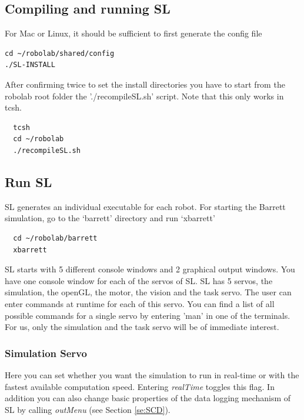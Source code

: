 \documentclass[11pt, article, colorback]{article}
\begin{document}
\subsection{Compiling and running SL}
For Mac or Linux, it should be sufficient to first generate the config file
\begin{lstlisting} 
cd ~/robolab/shared/config
./SL-INSTALL 
\end{lstlisting} 
After confirming twice to set the install directories you have to start from the robolab root folder the './recompileSL.sh' script. Note that this only works in tcsh.
\begin{lstlisting} 
  tcsh
  cd ~/robolab
  ./recompileSL.sh
\end{lstlisting} 

\subsection{Run SL}
SL generates an individual executable for each robot. For starting the Barrett simulation, go to the `barrett' directory and run `xbarrett'
\begin{lstlisting} 
  cd ~/robolab/barrett
  xbarrett
\end{lstlisting} 
SL starts with 5 different console windows and 2 graphical output windows. You have one console window for each of the servos of SL. SL has 5 servos, the simulation, the openGL, the motor, the vision and the task servo.  The  user can enter commands
at runtime for each of this servo. You can find a list of all possible commands for a single servo by entering 'man' in one of the terminals. 
For us, only the simulation and the task servo will be of immediate interest. 
\subsubsection*{Simulation Servo}
Here you can set whether you want the simulation to run in real-time or with the fastest available computation speed. Entering {\em realTime} toggles this flag. In addition you can also change basic properties 
of the data logging mechanism of SL by calling {\em outMenu} (see Section \ref{se:SCD}).
\end{document}
